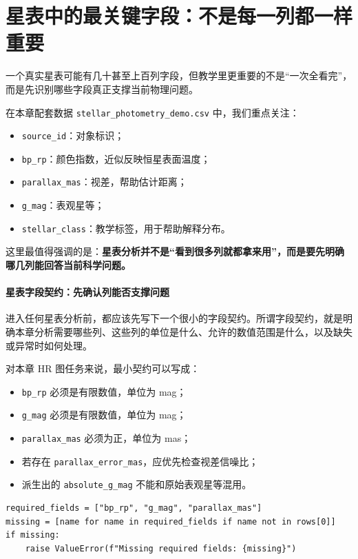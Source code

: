 \section{星表中的最关键字段：不是每一列都一样重要}

一个真实星表可能有几十甚至上百列字段，但教学里更重要的不是“一次全看完”，而是先识别哪些字段真正支撑当前物理问题。

在本章配套数据 \nolinkurl{stellar_photometry_demo.csv} 中，我们重点关注：

\begin{itemize}
    \item \texttt{source\_id}：对象标识；
    \item \texttt{bp\_rp}：颜色指数，近似反映恒星表面温度；
    \item \texttt{parallax\_mas}：视差，帮助估计距离；
    \item \texttt{g\_mag}：表观星等；
    \item \texttt{stellar\_class}：教学标签，用于帮助解释分布。
\end{itemize}

这里最值得强调的是：\textbf{星表分析并不是“看到很多列就都拿来用”，而是要先明确哪几列能回答当前科学问题。}

\paragraph{星表字段契约：先确认列能否支撑问题}

进入任何星表分析前，都应该先写下一个很小的字段契约。所谓字段契约，就是明确本章分析需要哪些列、这些列的单位是什么、允许的数值范围是什么，以及缺失或异常时如何处理。

对本章 HR 图任务来说，最小契约可以写成：

\begin{itemize}
    \item \texttt{bp\_rp} 必须是有限数值，单位为 mag；
    \item \texttt{g\_mag} 必须是有限数值，单位为 mag；
    \item \texttt{parallax\_mas} 必须为正，单位为 mas；
    \item 若存在 \texttt{parallax\_error\_mas}，应优先检查视差信噪比；
    \item 派生出的 \texttt{absolute\_g\_mag} 不能和原始表观星等混用。
\end{itemize}

\begin{examplebox}[最小字段契约检查]
\begin{lstlisting}[style=pythonstyle]
required_fields = ["bp_rp", "g_mag", "parallax_mas"]
missing = [name for name in required_fields if name not in rows[0]]
if missing:
    raise ValueError(f"Missing required fields: {missing}")
\end{lstlisting}
\end{examplebox}

